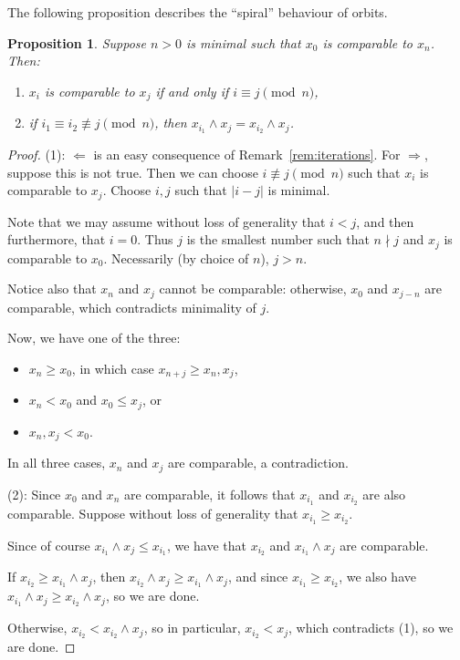 \documentclass[final,a4paper,12pt,reqno]{amsart}
\newcommand{\meet}{\mathop{\wedge}}
\newtheorem{prop}[thm]{Proposition}
\theoremstyle{remark}
\theoremstyle{definition}
\let \leq \leqslant
\let \geq \geqslant
\begin{document}
	The following proposition describes the ``spiral'' behaviour of orbits.
	\begin{prop}
		\label{prop:spirals}
		Suppose $n>0$ is minimal such that $x_0$ is comparable to $x_n$. Then:
		\begin{enumerate}
			\item
			$x_i$ is comparable to $x_j$ if and only if $i\equiv j\pmod n$,
			\item
			if $i_1\equiv i_2\not\equiv j\pmod n$, then $x_{i_1}\meet x_{j}=x_{i_2}\meet x_j$.
		\end{enumerate}
	\end{prop}
	\begin{proof}
		(1): $\Leftarrow$ is an easy consequence of Remark~\ref{rem:iterations}. For $\Rightarrow$, suppose this is not true. Then we can choose $i\not \equiv j \pmod n$ such that $x_i$ is comparable to $x_j$. Choose $i,j$ such that $\lvert i-j\rvert$ is minimal.
		
		Note that we may assume without loss of generality that $i<j$, and then furthermore, that $i=0$. Thus $j$ is the smallest number such that $n\nmid j$ and $x_j$ is comparable to $x_0$. Necessarily (by choice of $n$), $j>n$.
		
		Notice also that $x_n$ and $x_j$ cannot be comparable: otherwise, $x_0$ and $x_{j-n}$ are comparable, which contradicts minimality of $j$.
		
		Now, we have one of the three:
		\begin{itemize}
			\item
			$x_n\geq x_0$, in which case $x_{n+j}\geq x_n,x_j$,
			\item 
			$x_n<x_0$ and $x_0\leq x_j$, or
			\item 
			$x_n,x_j<x_0$.
		\end{itemize}
		In all three cases, $x_n$ and $x_j$ are comparable, a contradiction.
		
		(2): Since $x_0$ and $x_n$ are comparable, it follows that $x_{i_1}$ and $x_{i_2}$ are also comparable. Suppose without loss of generality that $x_{i_1}\geq x_{i_2}$.
		
		Since of course $x_{i_1}\meet x_j\leq x_{i_1}$, we have that $x_{i_2}$ and $x_{i_1}\meet x_j$ are comparable.
		
		If $x_{i_2}\geq x_{i_1}\meet x_j$, then $x_{i_2}\meet x_j\geq x_{i_1}\meet x_j$, and since $x_{i_1}\geq x_{i_2}$, we also have $x_{i_1}\meet x_j \geq x_{i_2}\meet x_j$, so we are done.
		
		Otherwise, $x_{i_2}<x_{i_2}\meet x_j$, so in particular, $x_{i_2}<x_j$, which contradicts (1), so we are done.
	\end{proof}
	
\end{document}
